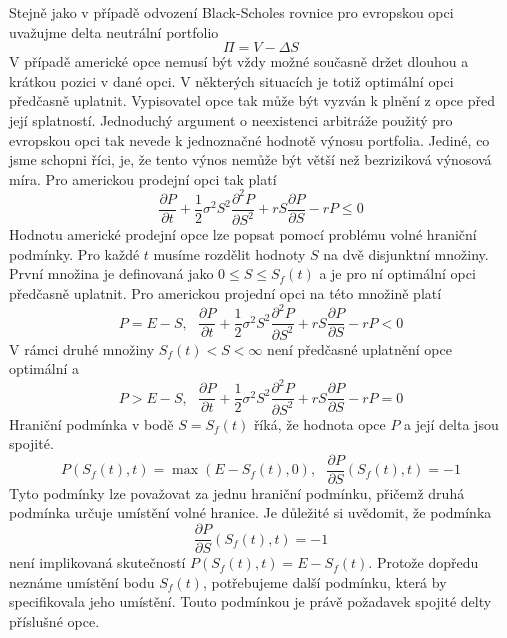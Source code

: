 \documentclass[a4paper]{book}
\begin{document}
Stejně jako v případě odvození Black-Scholes rovnice pro evropskou opci uvažujme delta neutrální portfolio
\begin{equation*}
\Pi = V - \Delta S
\end{equation*}
V případě americké opce nemusí být vždy možné současně držet dlouhou a krátkou pozici v dané opci. V některých situacích je totiž optimální opci předčasně uplatnit. Vypisovatel opce tak může být vyzván k plnění z opce před její splatností. Jednoduchý argument o neexistenci arbitráže použitý pro evropskou opci tak nevede k jednoznačné hodnotě výnosu portfolia. Jediné, co jsme schopni říci, je, že tento výnos nemůže být větší než bezriziková výnosová míra. Pro americkou prodejní opci tak platí
\begin{equation*}
\frac{\partial P}{\partial t} + \frac{1}{2}\sigma^2 S^2 \frac{\partial^2 P}{\partial S^2} + rS \frac{\partial P}{\partial S} - rP \le 0
\end{equation*}
Hodnotu americké prodejní opce lze popsat pomocí problému volné hraniční podmínky. Pro každé $t$ musíme rozdělit hodnoty $S$ na dvě disjunktní množiny. První množina je definovaná jako $0 \le S \le S_f(t)$ a je pro ní optimální opci předčasně uplatnit. Pro americkou projední opci na této množině platí
\begin{equation*}
P = E - S,~~~\frac{\partial P}{\partial t}+\frac{1}{2}\sigma^2S^2\frac{\partial^2 P}{\partial S^2} + rS\frac{\partial P}{\partial S} - rP < 0
\end{equation*}
V rámci druhé množiny $S_f(t) < S < \infty$ není předčasné uplatnění opce optimální a
\begin{equation*}
P > E - S,~~~\frac{\partial P}{\partial t}+\frac{1}{2}\sigma^2S^2\frac{\partial^2 P}{\partial S^2} + rS\frac{\partial P}{\partial S} - rP = 0
\end{equation*}
Hraniční podmínka v bodě $S = S_f(t)$ říká, že hodnota opce $P$ a její delta jsou spojité.
\begin{equation*}
P(S_f(t),t) = \max(E - S_f(t),0),~~~ \frac{\partial P}{\partial S}(S_f(t),t) = -1
\end{equation*}
Tyto podmínky lze považovat za jednu hraniční podmínku, přičemž druhá podmínka určuje umístění volné hranice. Je důležité si uvědomit, že podmínka
\begin{equation*}
\frac{\partial P}{\partial S}(S_f(t),t) = -1
\end{equation*}
není implikovaná skutečností $P(S_f(t),t) = E - S_f(t)$. Protože dopředu neznáme umístění bodu $S_f(t)$, potřebujeme další podmínku, která by specifikovala jeho umístění. Touto podmínkou je právě požadavek spojité delty příslušné opce.
\end{document}
